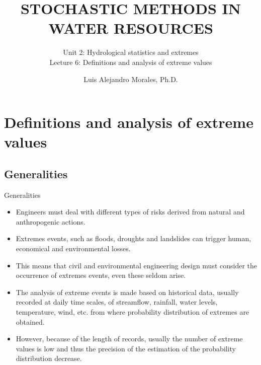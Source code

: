 \documentclass[8pt]{beamer}
\title{STOCHASTIC METHODS IN WATER RESOURCES}
\subtitle{Unit 2: Hydrological statistics and extremes \\ Lecture 6: Definitions and analysis of extreme values}
\author{Luis Alejandro Morales, Ph.D.}
\institute{Universidad Nacional de Colombia \\ Department of Civil and Agriculture Engineering} %
\renewcommand{\emph}[1]{\textcolor{myorange}{#1}}
\begin{document}
\begin{frame}
    \titlepage
\end{frame}

\section{Definitions and analysis of extreme values}
\subsection{Generalities}
\begin{frame}{Generalities}
    \begin{itemize}
        \item Engineers must deal with different types of risks derived from natural and anthropogenic actions. 
        \item Extremes events, such as \emph{floods}, \emph{droughts} and \emph{landslides} can trigger human, economical and environmental losses. 
        \item This means that civil and environmental  engineering design must consider the occurrence of extremes events, even these seldom arise. 
        \item The analysis of extreme events is made based on historical data, usually recorded at daily time scales, of \emph{streamflow}, \emph{rainfall}, \emph{water levels}, \emph{temperature}, \emph{wind}, etc. from where \emph{probability distribution of extremes} are obtained. 
        \item However, because of the \emph{length of  records}, usually the number of extreme values is \emph{low} and  thus the \emph{precision} of the estimation of the probability distribution \emph{decrease}.    
    \end{itemize}
\end{frame}
\end{document}
